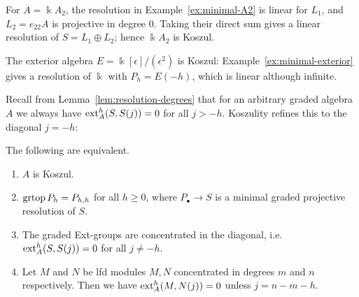 \begin{example}\label{ex:koszul-nonconnected}
For $A=\Bbbk A_2$, the resolution in Example~\ref{ex:minimal-A2} is linear for $L_1$, and $L_2=e_{22}A$ is projective in degree $0$.
Taking their direct sum gives a linear resolution of $S=L_1\oplus L_2$; hence $\Bbbk A_2$ is Koszul.
\end{example}

\begin{example}
The exterior algebra $E=\Bbbk[\epsilon]/(\epsilon^2)$ is Koszul: Example~\ref{ex:minimal-exterior} gives a resolution of $\Bbbk$ with $P_h=E(-h)$, which is linear although infinite.
\end{example}



Recall from Lemma~\ref{lem:resolution-degrees} that for an arbitrary graded algebra $A$ we always have $\operatorname{ext}\nolimits_A^{h}(S,S(j))=0$  for all $j>-h$.  
Koszulity refines this to the diagonal $j=-h$:


\begin{proposition}\label{prop:koszul-ext}
The following are equivalent.
\begin{enumerate}
\item $A$ is Koszul.

\item $\operatorname{grtop}\nolimits P_h=P_{h,h}$ for all $h\ge 0$, where $P_\bullet\to S$ is a minimal graded projective resolution of $S$.

\item The graded Ext-groups are concentrated in the diagonal, i.e. $\operatorname{ext}\nolimits_A^h(S,S(j))=0$ for all $j\neq-h$.


\item Let $M$ and $N$ be lfd modules $M,N$ concentrated in degrees $m$ and $n$ respectively.  Then we have $\operatorname{ext}\nolimits_A^h(M,N(j))=0$ unless $j=n-m-h$.
\end{enumerate}
\end{proposition}

